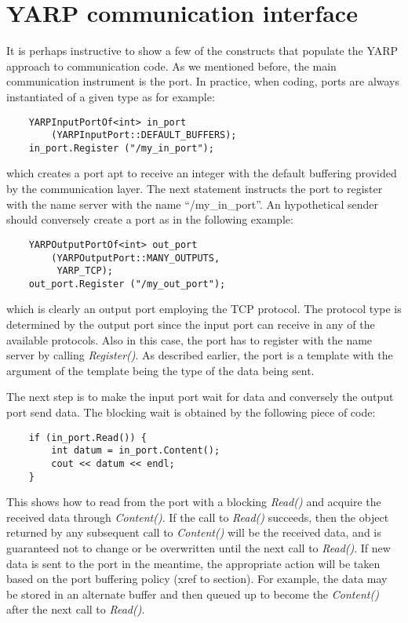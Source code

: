 \section{YARP communication interface}
It is perhaps instructive to show a few of the constructs that populate the YARP approach
to communication code. As we mentioned before, the main communication instrument is the 
port. In practice, when coding, ports are always instantiated of a given type as for 
example:
%
\begin{verbatim}
    YARPInputPortOf<int> in_port
        (YARPInputPort::DEFAULT_BUFFERS);
    in_port.Register ("/my_in_port");
\end{verbatim}
%
\noindent which creates a port apt to receive an integer with the default buffering
provided by the communication layer. The next statement 
instructs the port to register with the name server with the name ``/my\_in\_port''. An 
hypothetical sender should conversely create a port as in the following example:
%
\begin{verbatim}
    YARPOutputPortOf<int> out_port
        (YARPOutputPort::MANY_OUTPUTS, 
         YARP_TCP);
    out_port.Register ("/my_out_port");
\end{verbatim}
%
\noindent which is clearly an output port employing the TCP protocol. The protocol type
is determined by the output port since the input port can receive in any of the available
protocols. Also in this case, the port has to register with the name server by calling 
{\em Register()}. As described earlier, the port is a template with the argument of the
template being the type of the data being sent.

The next step is to make the input port wait for data and conversely the output port send
data. The blocking wait is obtained by the following piece of code:
%
\begin{verbatim}
    if (in_port.Read()) {
        int datum = in_port.Content();
        cout << datum << endl;
    }
\end{verbatim}
%
\noindent 
This shows how to read from the port with a blocking {\em Read()} and
acquire the received data through {\em Content()}. If the call to {\em
Read()} succeeds, then the object returned by any subsequent call to
{\em Content()} will be the received data, and is guaranteed not to
change or be overwritten until the next call to {\em Read()}.
If new data is sent to the port in the meantime, the appropriate
action will be taken based on the port buffering policy (xref to section).  For example,
the data may be stored in an alternate buffer and then queued up to 
become the {\em Content()} after the next call to {\em Read()}.

